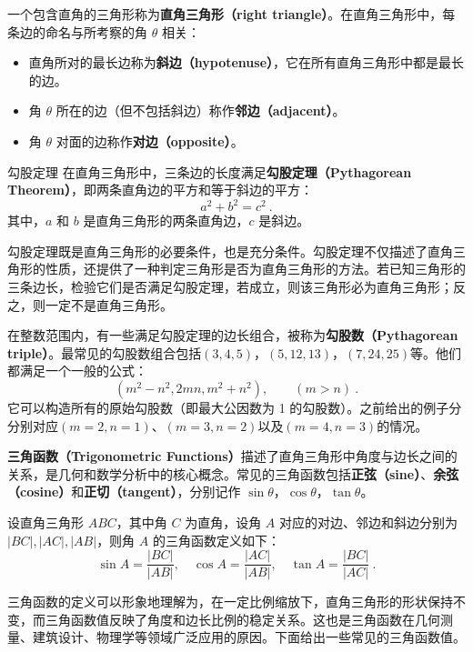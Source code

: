 一个包含直角的三角形称为\textbf{直角三角形（right triangle）}。在直角三角形中，每条边的命名与所考察的角 $\theta$ 相关：
\begin{itemize}
\item 直角所对的最长边称为\textbf{斜边（hypotenuse）}，它在所有直角三角形中都是最长的边。
\item 角 $\theta$ 所在的边（但不包括斜边）称作\textbf{邻边（adjacent）}。
\item 角 $\theta$ 对面的边称作\textbf{对边（opposite）}。
\end{itemize}

\begin{theorem}{勾股定理}
在直角三角形中，三条边的长度满足\textbf{勾股定理（Pythagorean Theorem）}，即两条直角边的平方和等于斜边的平方：
\begin{equation}
a^2 + b^2 = c^2~.
\end{equation}
其中，$a$ 和 $b$ 是直角三角形的两条直角边，$c$ 是斜边。
\end{theorem}

勾股定理既是直角三角形的必要条件，也是充分条件。勾股定理不仅描述了直角三角形的性质，还提供了一种判定三角形是否为直角三角形的方法。若已知三角形的三条边长，检验它们是否满足勾股定理，若成立，则该三角形必为直角三角形；反之，则一定不是直角三角形。

在整数范围内，有一些满足勾股定理的边长组合，被称为\textbf{勾股数（Pythagorean triple）}。最常见的勾股数组合包括$(3,4,5)$，$(5,12,13)$，$(7,24,25)$等。他们都满足一个一般的公式：
\begin{equation}
(m^2 - n^2, 2mn, m^2 + n^2),\qquad(m>n)~.
\end{equation}
它可以构造所有的原始勾股数（即最大公因数为 1 的勾股数）。之前给出的例子分分别对应$(m=2,n=1)$、$(m=3,n=2)$以及$(m=4,n=3)$的情况。

\textbf{三角函数（Trigonometric Functions）}描述了直角三角形中角度与边长之间的关系，是几何和数学分析中的核心概念。常见的三角函数包括\textbf{正弦（sine）}、\textbf{余弦（cosine）}和\textbf{正切（tangent）}，分别记作 $\sin\theta$，$\cos\theta$，$\tan\theta$。

设直角三角形 $ABC$，其中角 $C$ 为直角，设角 $A$ 对应的对边、邻边和斜边分别为 $|BC|, |AC|, |AB|$，则角 $A$ 的三角函数定义如下：
\begin{equation}
\sin A = \frac{|BC|}{|AB|}, \quad
\cos A = \frac{|AC|}{|AB|}, \quad
\tan A = \frac{|BC|}{|AC|}~.
\end{equation}

三角函数的定义可以形象地理解为，在一定比例缩放下，直角三角形的形状保持不变，而三角函数值反映了角度和边长比例的稳定关系。这也是三角函数在几何测量、建筑设计、物理学等领域广泛应用的原因。下面给出一些常见的三角函数值。

